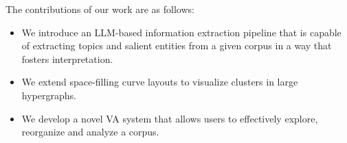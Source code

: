 The contributions of our work are as follows:
\begin{itemize}[noitemsep]
    \item We introduce an LLM-based information extraction pipeline that is capable of extracting topics and salient entities from a given corpus in a way that fosters interpretation.
    \item We extend space-filling curve layouts to visualize clusters in large hypergraphs.
    \item We develop a novel VA system that allows users to effectively explore, reorganize and analyze a corpus.
\end{itemize}